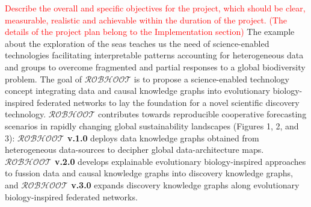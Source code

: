 \documentclass[11pt, a4paper]{article} %
\begin{document}
\textcolor{red}{Describe the overall and specific objectives for the
  project, which should be clear, measurable, realistic and achievable
  within the duration of the project. (The details of the project plan
  belong to the Implementation section)} The example about the
exploration of the seas teaches us the need of science-enabled
technologies facilitating interpretable patterns accounting for
heterogeneous data and groups to overcome fragmented and partial
responses to a global biodiversity problem. The goal of
$\mathcal{ROBHOOT}$ is to propose a science-enabled technology concept
integrating data and causal knowledge graphs into evolutionary
biology-inspired federated networks to lay the foundation for a novel
scientific discovery technology. $\mathcal{ROBHOOT}$ contributes
towards reproducible cooperative forecasting scenarios in rapidly
changing global sustainability landscapes (Figures 1, 2, and 3): {\bf
  $\mathcal{ROBHOOT}$ v.1.0} deploys data knowledge graphs obtained
from heterogeneous data-sources to decipher global data-architecture
maps. {\bf $\mathcal{ROBHOOT}$ v.2.0} develops explainable
evolutionary biology-inspired approaches to fussion data and causal
knowledge graphs into discovery knowledge graphs, and {\bf
  $\mathcal{ROBHOOT}$ v.3.0} expands discovery knowledge graphs along
evolutionary biology-inspired federated networks.
\end{document}
